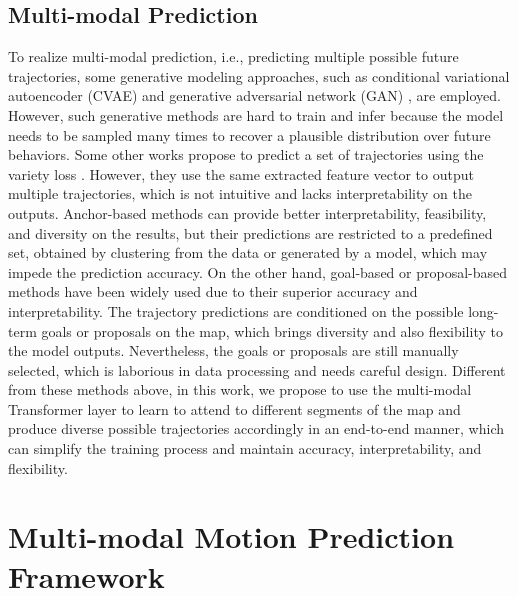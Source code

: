 \documentclass[letterpaper, 10 pt, conference]{ieeeconf}
\begin{document}
\subsection{Multi-modal Prediction}
To realize multi-modal prediction, i.e., predicting multiple possible future trajectories, some generative modeling approaches, such as conditional variational autoencoder (CVAE) \cite{lee2017desire, ivanovic2020multimodal} and generative adversarial network (GAN) \cite{gupta2018social}, are employed. However, such generative methods are hard to train and infer because the model needs to be sampled many times to recover a plausible distribution over future behaviors. Some other works propose to predict a set of trajectories \cite{cui2019multimodal, liang2020learning, ye2021tpcn} using the variety loss \cite{thiede2019analyzing}. However, they use the same extracted feature vector to output multiple trajectories, which is not intuitive and lacks interpretability on the outputs. Anchor-based methods \cite{chai2020multipath, phan2020covernet, song2021learning} can provide better interpretability, feasibility, and diversity on the results, but their predictions are restricted to a predefined set, obtained by clustering from the data or generated by a model, which may impede the prediction accuracy. On the other hand, goal-based \cite{zhao2020tnt} or proposal-based methods \cite{zhang2020map, liu2021multimodal, fang2020tpnet} have been widely used due to their superior accuracy and interpretability. The trajectory predictions are conditioned on the possible long-term goals or proposals on the map, which brings diversity and also flexibility to the model outputs. Nevertheless, the goals or proposals are still manually selected, which is laborious in data processing and needs careful design. Different from these methods above, in this work, we propose to use the multi-modal Transformer layer to learn to attend to different segments of the map and produce diverse possible trajectories accordingly in an end-to-end manner, which can simplify the training process and maintain accuracy, interpretability, and flexibility.


\section{Multi-modal Motion Prediction Framework}
\end{document}
